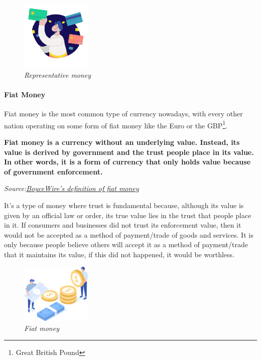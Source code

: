 \documentclass{article}
\newcommand\tab[1][1cm]{\hspace*{#1}}
\begin{document}
\begin{figure}[H]
    \begin{center}
        \includegraphics[width=0.3\textwidth]{images/representative_money.png}
        \caption{\textit{Representative money}}
    \end{center}
\end{figure}

\paragraph{Fiat Money}

\tab Fiat money is the most common type of currency nowadays, with every other nation operating on some form of fiat money like the Euro or the GBP\footnote{Great British Pound}.

\renewcommand{\epigraphflush}{center}
\epigraph{\textbf{Fiat money is a currency without an underlying value. Instead, its value is derived by government and the trust people place in its value. In other words, it is a form of currency that only holds value because of government enforcement.}}{\textit{Source:\href{https://boycewire.com/fiat-money-definition/#FiatVsRepresentative}{\underline{BoyceWire's definition of fiat money}}}}

It’s a type of money where trust is fundamental because, although its value is given by an official law or order, its true value lies in the trust that people place in it. If consumers and businesses did not trust its enforcement value, then it would not be accepted as a method of payment/trade of goods and services. It is only because people believe others will accept it as a method of payment/trade that it maintains its value, if this did not happened, it would be worthless.

\begin{figure}[H]
    \begin{center}
        \includegraphics[width=0.3\textwidth]{images/fiat_money.png}
        \caption{\textit{Fiat money}}
    \end{center}
\end{figure}
\end{document}

